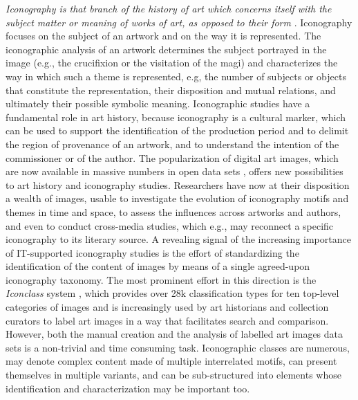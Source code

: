 \documentclass[acmlarge]{acmart}
\begin{document}
\textit{Iconography is that branch of the history of art which concerns itself with the subject matter or meaning of works of art, as opposed to their form} \cite{panofsky39}. Iconography focuses  on the subject  of an artwork and on the way it is represented. The iconographic analysis of an artwork determines the subject portrayed in the image (e.g., the crucifixion or the visitation of the magi) and characterizes the way in which such a theme is represented, e.g, the number of subjects or objects that constitute the representation, their disposition and mutual relations, and ultimately their possible symbolic meaning. 
Iconographic studies have a fundamental role in art history, because iconography is a cultural marker, which can be used to support the identification of  the production period and to delimit the region of provenance of an artwork, and to understand the intention of the commissioner or of the author. 
The popularization of digital art images, which are now available in massive numbers in open data sets \cite{mensink2014rijksmuseum,stefanini2019artpedia}, offers new possibilities to art history and iconography studies. Researchers have now at their disposition a wealth of images, usable to investigate the evolution of iconography motifs  and themes in time and space, to assess the influences across  artworks and authors, and even to conduct cross-media studies, which e.g., may reconnect a specific iconography to its literary source.  A revealing signal of the increasing importance of IT-supported iconography studies is the effort of standardizing the identification of the content of images by means of a single agreed-upon iconography taxonomy. The most prominent effort in this direction is the \textit{Iconclass} system \cite{couprie1983iconclass}, which provides over 28k classification types for ten top-level categories of images and is increasingly used by art historians and collection curators to label art images in a way that facilitates search and comparison.
However, both the manual creation and the analysis of  labelled art images data sets is  a non-trivial and time consuming task. Iconographic classes are numerous,  may denote complex content made of multiple interrelated motifs, can present themselves in multiple variants, and can be sub-structured into elements whose identification and characterization may be important too.
\end{document}
